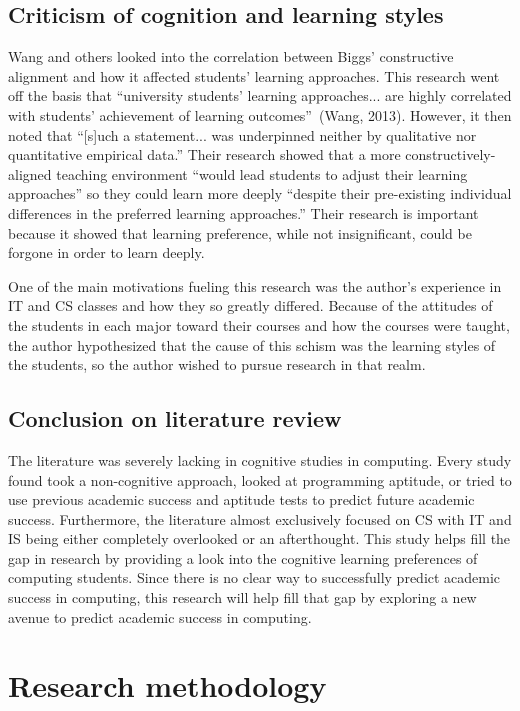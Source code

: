 \subsection{Criticism of cognition and learning styles}
Wang and others looked into the correlation between Biggs' constructive alignment and how it affected students' learning approaches. This research went off the basis that ``university students' learning approaches... are highly correlated with students' achievement of learning outcomes''~(Wang, 2013). However, it then noted that ``[s]uch a statement... was underpinned neither by qualitative nor quantitative empirical data.'' Their research showed that a more constructively-aligned teaching environment ``would lead students to adjust their learning approaches'' so they could learn more deeply ``despite their pre-existing individual differences
in the preferred learning approaches.'' Their research is important because it showed that learning preference, while not insignificant, could be forgone in order to learn deeply.

One of the main motivations fueling this research was the author's experience in IT and CS classes and how they so greatly differed. Because of the attitudes of the students in each major toward their courses and how the courses were taught, the author hypothesized that the cause of this schism was the learning styles of the students, so the author wished to pursue research in that realm.

\subsection{Conclusion on literature review}
The literature was severely lacking in cognitive studies in computing. Every study found took a non-cognitive approach, looked at programming aptitude, or tried to use previous academic success and aptitude tests to predict future academic success. Furthermore, the literature almost exclusively focused on CS with IT and IS being either completely overlooked or an afterthought. This study helps fill the gap in research by providing a look into the cognitive learning preferences of computing students. Since there is no clear way to successfully predict academic success in computing, this research will help fill that gap by exploring a new avenue to predict academic success in computing.

\section{Research methodology}

